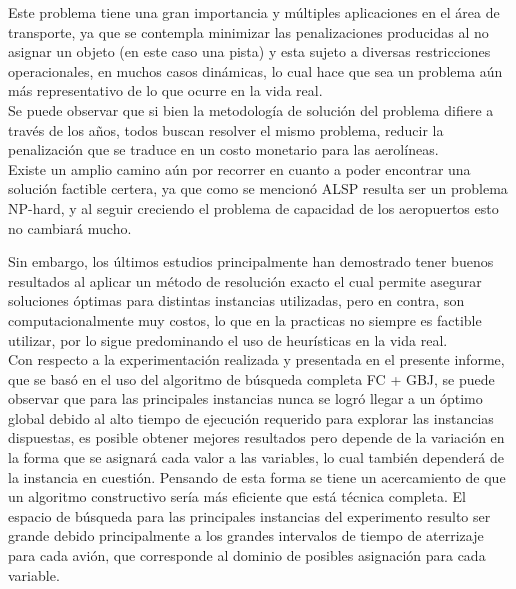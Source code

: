 \documentclass[letter, 10pt]{article}
\begin{document}
Este problema tiene una gran importancia y múltiples aplicaciones en el área de transporte, ya que se contempla minimizar las penalizaciones producidas al no asignar un objeto (en este caso una pista) y esta sujeto a diversas restricciones operacionales, en muchos casos dinámicas, lo cual hace que sea un problema aún más representativo de lo que ocurre en la vida real.\\
Se puede observar que si bien la metodología de solución del problema difiere a través de los años, todos buscan resolver el mismo problema, reducir la penalización que se traduce en un costo monetario para las aerolíneas.\\

Existe un amplio camino aún por recorrer en cuanto a poder encontrar una solución factible certera, ya que como se mencionó ALSP resulta ser un problema NP-hard, y al seguir creciendo el problema de capacidad de los aeropuertos esto no cambiará mucho.

Sin embargo, los últimos estudios principalmente \cite{2013, 2015, SALEHIPOUR2020179} han demostrado tener buenos resultados al aplicar un método de resolución exacto el cual permite asegurar soluciones óptimas para distintas instancias utilizadas, pero en contra, son computacionalmente muy costos, lo que en la practicas no siempre es factible utilizar, por lo sigue predominando el uso de heurísticas en la vida real.\\

Con respecto a la experimentación realizada y presentada en el presente informe, que se basó en el uso del algoritmo de búsqueda completa FC + GBJ, se puede observar que para las principales instancias nunca se logró llegar a un óptimo global debido al alto tiempo de ejecución requerido para explorar las instancias dispuestas, es posible obtener mejores resultados pero depende de la variación en la forma que se asignará cada valor a las variables, lo cual también dependerá de la instancia en cuestión. Pensando de esta forma se tiene un acercamiento de que un algoritmo constructivo sería más eficiente que está técnica completa. El espacio de búsqueda para las principales instancias del experimento resulto ser grande debido principalmente a los grandes intervalos de tiempo de aterrizaje para cada avión, que corresponde al dominio de posibles asignación para cada variable.\\
\end{document}
